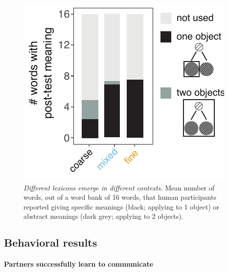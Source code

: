 
\begin{figure}[t]
\begin{center}
\includegraphics[scale=1]{./figures/Exp2_postTest}
\caption{\emph{Different lexicons emerge in different contexts.} Mean number of words, out of a word bank of 16 words, that human participants reported giving specific meanings (black; applying to 1 object) or abstract meanings (dark grey; applying to 2 objects).}
\label{fig:sec2postTest}
\end{center}
\end{figure}


\subsection{Behavioral results}

\paragraph{Partners successfully learn to communicate}

